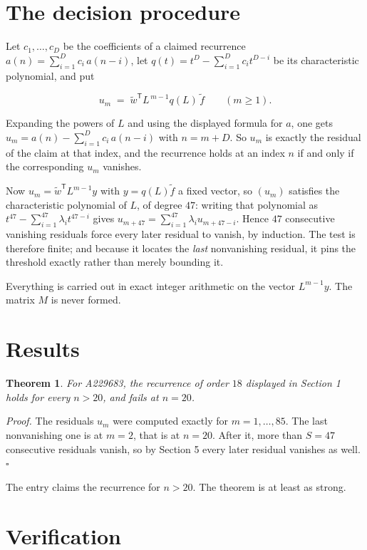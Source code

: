 \documentclass[11pt]{article}
\newtheorem{theorem}{Theorem}
\theoremstyle{definition}
\begin{document}
\section{The decision procedure}

Let $c_1,\dots,c_D$ be the coefficients of a claimed recurrence $a(n) = \sum_{i=1}^{D} c_i\,a(n-i)$, let $q(t) = t^{D} - \sum_{i=1}^{D} c_i t^{D-i}$ be its characteristic polynomial, and put

\[u_m \;=\; \tilde w^{\mathsf T} L^{\,m-1} q(L)\,\tilde f \qquad (m \ge 1).\]

Expanding the powers of $L$ and using the displayed formula for $a$, one gets $u_m = a(n) - \sum_{i=1}^{D} c_i\,a(n-i)$ with $n = m + D$. So $u_m$ is exactly the residual of the claim at that index, and the recurrence holds at an index $n$ if and only if the corresponding $u_m$ vanishes.

Now $u_m = \tilde w^{\mathsf T} L^{m-1} y$ with $y = q(L)\tilde f$ a fixed vector, so $(u_m)$ satisfies the characteristic polynomial of $L$, of degree $47$: writing that polynomial as $t^{47} - \sum_{i=1}^{47} \lambda_i t^{47-i}$ gives $u_{m+47} = \sum_{i=1}^{47} \lambda_i u_{m+47-i}$. Hence $47$ consecutive vanishing residuals force every later residual to vanish, by induction. The test is therefore finite; and because it locates the {\itshape last} nonvanishing residual, it pins the threshold exactly rather than merely bounding it.

Everything is carried out in exact integer arithmetic on the vector $L^{m-1}y$. The matrix $M$ is never formed.

\section{Results}

\begin{theorem} For A229683, the recurrence of order $18$ displayed in Section 1 holds for every $n > 20$, and fails at $n = 20$.\end{theorem}

{\itshape Proof.} The residuals $u_m$ were computed exactly for $m = 1,\dots,85$. The last nonvanishing one is at $m = 2$, that is at $n = 20$. After it, more than $S = 47$ consecutive residuals vanish, so by Section 5 every later residual vanishes as well. $\square$

The entry claims the recurrence for $n > 20$. The theorem is at least as strong.

\section{Verification}
\end{document}
